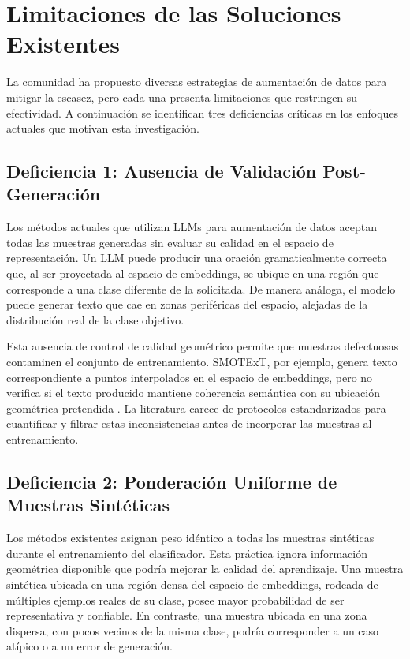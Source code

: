 \section{Limitaciones de las Soluciones Existentes}

La comunidad ha propuesto diversas estrategias de aumentación de datos para mitigar la escasez, pero cada una presenta limitaciones que restringen su efectividad. A continuación se identifican tres deficiencias críticas en los enfoques actuales que motivan esta investigación.

\subsection{Deficiencia 1: Ausencia de Validación Post-Generación}

Los métodos actuales que utilizan LLMs para aumentación de datos aceptan todas las muestras generadas sin evaluar su calidad en el espacio de representación. Un LLM puede producir una oración gramaticalmente correcta que, al ser proyectada al espacio de embeddings, se ubique en una región que corresponde a una clase diferente de la solicitada. De manera análoga, el modelo puede generar texto que cae en zonas periféricas del espacio, alejadas de la distribución real de la clase objetivo.

Esta ausencia de control de calidad geométrico permite que muestras defectuosas contaminen el conjunto de entrenamiento. SMOTExT, por ejemplo, genera texto correspondiente a puntos interpolados en el espacio de embeddings, pero no verifica si el texto producido mantiene coherencia semántica con su ubicación geométrica pretendida \cite{smotext2025arxiv}. La literatura carece de protocolos estandarizados para cuantificar y filtrar estas inconsistencias antes de incorporar las muestras al entrenamiento.

\subsection{Deficiencia 2: Ponderación Uniforme de Muestras Sintéticas}

Los métodos existentes asignan peso idéntico a todas las muestras sintéticas durante el entrenamiento del clasificador. Esta práctica ignora información geométrica disponible que podría mejorar la calidad del aprendizaje. Una muestra sintética ubicada en una región densa del espacio de embeddings, rodeada de múltiples ejemplos reales de su clase, posee mayor probabilidad de ser representativa y confiable. En contraste, una muestra ubicada en una zona dispersa, con pocos vecinos de la misma clase, podría corresponder a un caso atípico o a un error de generación.

